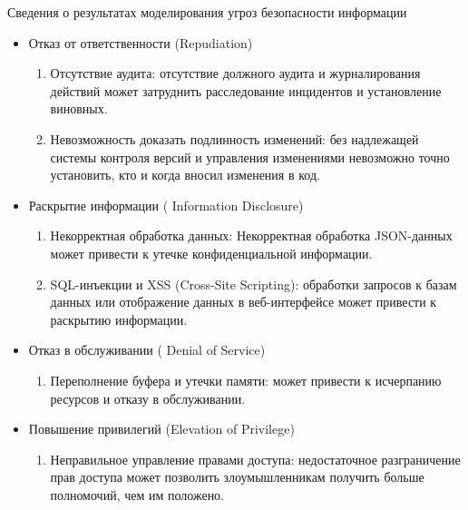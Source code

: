 \documentclass[10pt]{beamer}
\begin{document}
\begin{frame}{Сведения о результатах моделирования угроз безопасности информации}
    \begin{itemize}
        \item Отказ от ответственности (Repudiation)
        \begin{enumerate}
            \item Отсутствие аудита: отсутствие должного аудита и журналирования действий может затруднить расследование инцидентов и установление виновных.
            \item Невозможность доказать подлинность изменений: без надлежащей системы контроля версий и управления изменениями невозможно точно установить, кто и когда вносил изменения в код.
        \end{enumerate}

        \item Раскрытие информации ( Information Disclosure)
        \begin{enumerate}
            \item Некорректная обработка данных: Некорректная обработка JSON-данных может привести к утечке конфиденциальной информации.
            \item SQL-инъекции и XSS (Cross-Site Scripting): обработки запросов к базам данных или отображение данных в веб-интерфейсе может привести к раскрытию информации.
        \end{enumerate}

        \item Отказ в обслуживании ( Denial of Service)
        \begin{enumerate}
            \item Переполнение буфера и утечки памяти: может привести к исчерпанию ресурсов и отказу в обслуживании.
        \end{enumerate}

        \item Повышение привилегий (Elevation of Privilege)
        \begin{enumerate}
            \item Неправильное управление правами доступа: недостаточное разграничение прав доступа может позволить злоумышленникам получить больше полномочий, чем им положено.
        \end{enumerate}
    \end{itemize}
\end{frame}
\end{document}
